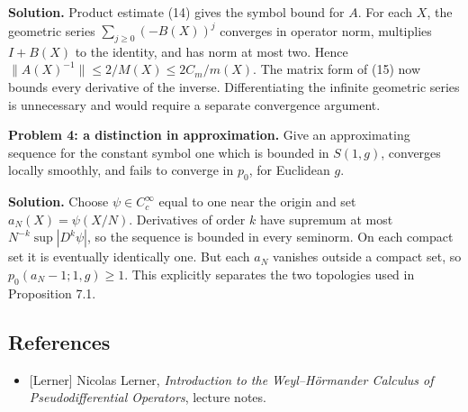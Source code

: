 \documentclass[
  11pt,
]{article}
\providecommand{\tightlist}{%
  \setlength{\itemsep}{0pt}\setlength{\parskip}{0pt}}
\begin{document}
\textbf{Solution.} Product estimate (14) gives the symbol bound for
\(A\). For each \(X\), the geometric series \(\sum_{j\geq0}(-B(X))^j\)
converges in operator norm, multiplies \(I+B(X)\) to the identity, and
has norm at most two. Hence \(\|A(X)^{-1}\|\leq2/M(X)\leq2C_m/m(X)\).
The matrix form of (15) now bounds every derivative of the inverse.
Differentiating the infinite geometric series is unnecessary and would
require a separate convergence argument.

\textbf{Problem 4: a distinction in approximation.} Give an
approximating sequence for the constant symbol one which is bounded in
\(S(1,g)\), converges locally smoothly, and fails to converge in
\(p_0\), for Euclidean \(g\).

\textbf{Solution.} Choose \(\psi\in C_c^\infty\) equal to one near the
origin and set \(a_N(X)=\psi(X/N)\). Derivatives of order \(k\) have
supremum at most \(N^{-k}\sup|D^k\psi|\), so the sequence is bounded in
every seminorm. On each compact set it is eventually identically one.
But each \(a_N\) vanishes outside a compact set, so
\(p_0(a_N-1;1,g)\geq1\). This explicitly separates the two topologies
used in Proposition 7.1.

\subsection{References}\label{references}

\begin{itemize}
\tightlist
\item
  {[}Lerner{]} Nicolas Lerner, \emph{Introduction to the Weyl--Hörmander
  Calculus of Pseudodifferential Operators}, lecture notes.
\end{itemize}
\end{document}
